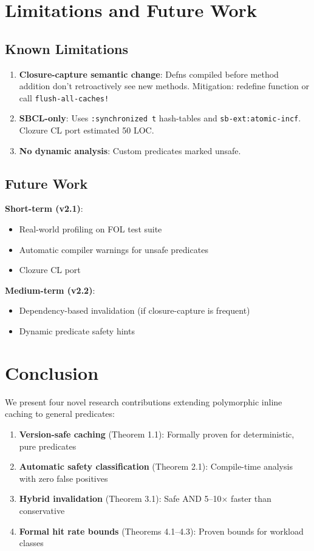 \documentclass[sigplan,review,anonymous]{acmart}
\begin{document}
\section{Limitations and Future Work}

\subsection{Known Limitations}

\begin{enumerate}
\item \textbf{Closure-capture semantic change}: Defns compiled before method addition don't retroactively see new methods. Mitigation: redefine function or call \texttt{flush-all-caches!}
\item \textbf{SBCL-only}: Uses \texttt{:synchronized t} hash-tables and \texttt{sb-ext:atomic-incf}. Clozure CL port estimated 50 LOC.
\item \textbf{No dynamic analysis}: Custom predicates marked unsafe.
\end{enumerate}

\subsection{Future Work}

\textbf{Short-term (v2.1)}:
\begin{itemize}
\item Real-world profiling on FOL test suite
\item Automatic compiler warnings for unsafe predicates
\item Clozure CL port
\end{itemize}

\textbf{Medium-term (v2.2)}:
\begin{itemize}
\item Dependency-based invalidation (if closure-capture is frequent)
\item Dynamic predicate safety hints
\end{itemize}

\section{Conclusion}

We present four novel research contributions extending polymorphic inline caching to general predicates:

\begin{enumerate}
\item \textbf{Version-safe caching} (Theorem 1.1): Formally proven for deterministic, pure predicates
\item \textbf{Automatic safety classification} (Theorem 2.1): Compile-time analysis with zero false positives
\item \textbf{Hybrid invalidation} (Theorem 3.1): Safe AND 5--10$\times$ faster than conservative
\item \textbf{Formal hit rate bounds} (Theorems 4.1--4.3): Proven bounds for workload classes
\end{enumerate}
\end{document}
